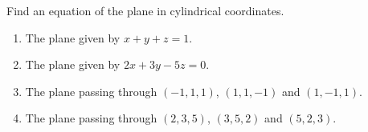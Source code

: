 Find an equation of the plane in cylindrical coordinates.

\begin{enumerate}
\item The plane given by $x+y+z=1$.
\item The plane given by $2x+3y-5z=0$.
\item The plane passing through $(-1, 1, 1)$, $(1, 1, -1)$ and $(1, -1, 1)$.
\item The plane passing through $(2,3,5 )$, $(3, 5, 2)$ and $(5, 2, 3)$.
\end{enumerate}